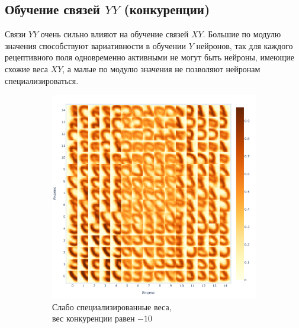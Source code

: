 \documentclass[a4paper]{article}
\begin{document}
\subsection{Обучение связей $YY$ (конкуренции)}
Связи $YY$ очень сильно влияют на обучение связей $XY$. Большие по модулю значения способствуют вариативности в обучении $Y$ нейронов, так для каждого рецептивного поля одновременно активными не могут быть нейроны, имеющие схожие веса $XY$, а малые по модулю значения не позволяют нейронам специализироваться.

\begin{figure}
\centering
\begin{subfigure}{0.2\textwidth}
    \includegraphics[width=\textwidth,keepaspectratio=true]{weights_XY_bad_ru.pdf}
    \caption{Слабо специализированные веса,\\ вес конкуренции равен $-10$}
\end{subfigure}
\begin{subfigure}{0.2\textwidth}

\end{subfigure}
\end{figure}
\end{document}
